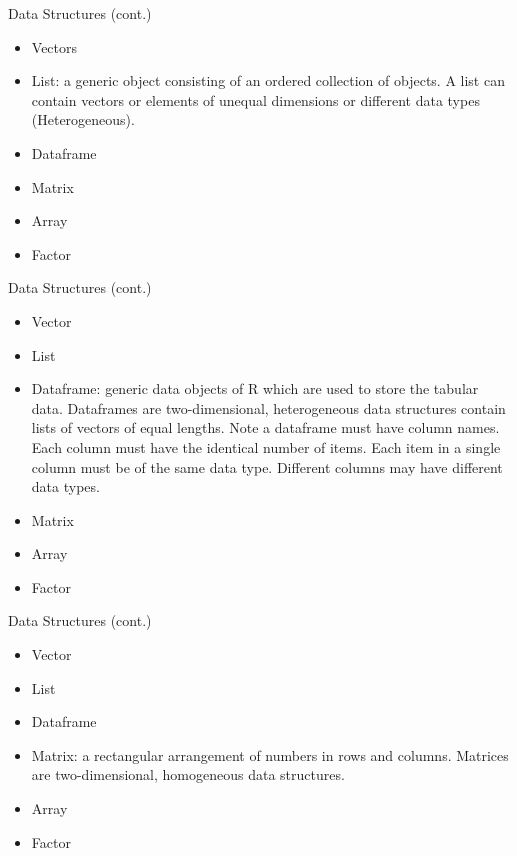 \documentclass{beamer}
\begin{document}
\begin{frame}{Data Structures (cont.)}
\begin{itemize}
    \item Vectors
    \item List: a generic object consisting of an ordered collection of objects. A list can contain vectors or elements of unequal dimensions or different data types (Heterogeneous).
    \item Dataframe
    \item Matrix
    \item Array
    \item Factor
\end{itemize}
    
\end{frame}

\begin{frame}{Data Structures (cont.)}
\begin{itemize}
    \item Vector
    \item List
    \item Dataframe: generic data objects of R which are used to store the tabular data. Dataframes are two-dimensional, heterogeneous data structures contain lists of vectors of equal lengths. Note a dataframe must have column names. Each column must have the identical number of items. Each item in a single column must be of the same data type. Different columns may have different data types.
    \item Matrix
    \item Array
    \item Factor
\end{itemize}
    
\end{frame}

\begin{frame}{Data Structures (cont.)}
\begin{itemize}
    \item Vector
    \item List
    \item Dataframe
    \item Matrix: a rectangular arrangement of numbers in rows and columns. Matrices are two-dimensional, homogeneous data structures.
    \item Array
    \item Factor
\end{itemize}
    
\end{frame}
\end{document}
